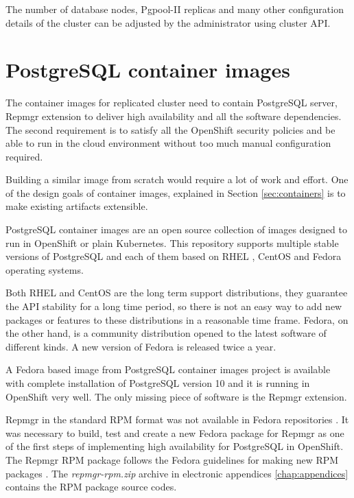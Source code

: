 \documentclass[
  digital, %
  twoside, %
  table,   %
  nolof,   %
  nolot,   %
]{fithesis3}
\begin{document}
The number of database nodes, Pgpool-II replicas and many other configuration details of the cluster can be adjusted by the administrator using cluster API.

\section{PostgreSQL container images} \label{sec:pg_cnt_images}
The container images for replicated cluster need to contain PostgreSQL server, Repmgr extension to deliver high availability and all the software dependencies. The second requirement is to satisfy all the OpenShift security policies and be able to run in the cloud environment without too much manual configuration required.

Building a similar image from scratch would require a lot of work and effort. One of the design goals of container images, explained in Section \ref{sec:containers} is to make existing artifacts extensible.

PostgreSQL container images \cite{pg_cnt} are an open source collection of images designed to run in OpenShift or plain Kubernetes. This repository supports multiple stable versions of PostgreSQL and each of them based on RHEL \cite{rhel}, CentOS \cite{centos} and Fedora \cite{getfedora} operating systems.

Both RHEL and CentOS are the long term support distributions, they guarantee the API stability for a long time period, so there is not an easy way to add new packages or features to these distributions in a reasonable time frame. Fedora, on the other hand, is a community distribution opened to the latest software of different kinds. A new version of Fedora is released twice a year.

A Fedora based image from PostgreSQL container images project is available with complete installation of PostgreSQL version 10 and it is running in OpenShift very well. The only missing piece of software is the Repmgr extension.

Repmgr in the standard RPM \cite{rpm} format was not available in Fedora repositories \cite{fedora_repositories}. It was necessary to build, test and create a new Fedora package for Repmgr \cite{fedora_repmgr} as one of the first steps of implementing high availability for PostgreSQL in OpenShift. The Repmgr RPM package follows the Fedora guidelines for making new RPM packages \cite{fedora_new_package}. The \textit{repmgr-rpm.zip} archive in electronic appendices \ref{chap:appendices} contains the RPM package source codes.
\end{document}
